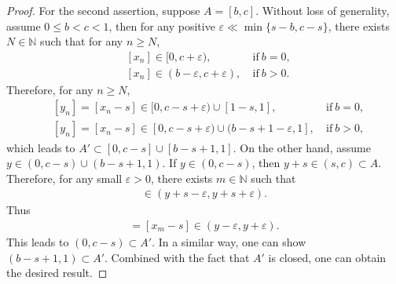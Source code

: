 \documentclass[12pt]{amsart}
\theoremstyle{plain}
\theoremstyle{definition}
\begin{document}
\begin{proof}
	For the second assertion, suppose $A=[b,c]$. Without loss of generality, assume $0\leq b<c<1$, then for any positive $\varepsilon\ll\min\{s-b,c-s\}$, there exists $N\in\mathbb{N}$ such that for any $n\geq N$,
	\begin{align}
		&[x_n]\in [0,c+\varepsilon),\ &\mathrm{if}\ b=0,\nonumber\\
		&[x_n]\in (b-\varepsilon,c+\varepsilon),\ &\mathrm{if}\ b>0.\nonumber
	\end{align}
	Therefore, for any $n\geq N$,
	\begin{align}
		&[y_n]=[x_n-s]\in [0,c-s+\varepsilon)\cup [1-s,1],\ &\mathrm{if}\ b=0,\nonumber\\
		&[y_n]=[x_n-s]\in [0,c-s+\varepsilon)\cup (b-s+1-\varepsilon,1],\ &\mathrm{if}\ b>0,\nonumber
	\end{align}
which leads to $A'\subset [0,c-s]\cup [b-s+1,1]$. On the other hand, assume $y\in (0,c-s)\cup (b-s+1,1)$. If $y\in (0,c-s)$, then $y+s\in (s,c)\subset A$. Therefore, for any small $\varepsilon>0$, there exists $m\in \mathbb{N}$ such that
\begin{align}
	[x_m]\in (y+s-\varepsilon,y+s+\varepsilon).\nonumber
\end{align}
Thus
\begin{align}
	[y_m]=[x_m-s]\in (y-\varepsilon,y+\varepsilon).\nonumber
\end{align}
This leads to $(0,c-s)\subset A'$. In a similar way, one can show $(b-s+1,1)\subset A'$. Combined with the fact that $A'$ is closed, one can obtain the desired result.
\end{proof}
\end{document}
